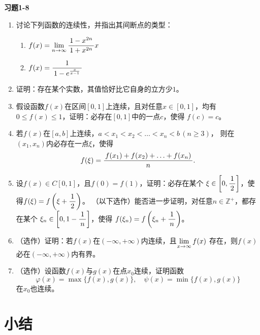 \begin{ext}
	{\centering\bf 习题1-8}
	
	\begin{enumerate}  
	  \item 讨论下列函数的连续性，并指出其间断点的类型：
	  \begin{enumerate}[(1)]
	  	\item $f(x)=\lim\limits_{n\to\infty}\displaystyle\frac{\,{1-x^{2n}}\,}{\,{1+x^{2n}}\,}x$
	  	\item $f(x)=\displaystyle\frac{\,{1}\,}{\,{1-e^{\frac{x}{x-1}}}\,}$
	  \end{enumerate}
	  \item 证明：存在某个实数，其值恰好比它自身的立方少$1$。
	  \item 假设函数$f(x)$在区间$[0,1]$上连续，且对任意$x\in[0,1]$，均有
		$0\leq f(x)\leq 1$，证明：必存在$[0,1]$中的一点$c$，使得
		$f(c)=c$。
	  \item 若$f(x)$在$[a,b]$上连续，$a<x_1<x_2<\ldots<x_n<b\,(n\geq3)$，
		则在$(x_1,x_n)$内必存在一点$\xi$，使得
		$$f(\xi)=\displaystyle\frac{\,{f(x_1)+f(x_2)+\ldots+f(x_n)}\,}{\,{n}\,}.$$ 
	  \item 设$f(x)\in C[0,1]$，且$f(0)=f(1)$，证明：必存在某个
	  $\xi\in\left[0,\displaystyle\frac{\,{1}\,}{\,{2}\,}\right]$，使得$f(\xi)=f\left(\xi+\displaystyle\frac{\,{1}\,}{\,{2}\,}\right)$。
	  （以下选作）能否进一步证明，对任意$n\in\mathbb{Z}^+$，都存在某个
	  $\xi_n\in\left[0,1-\displaystyle\frac{\,{1}\,}{\,{n}\,}\right]$，使得
	  $f(\xi_n)=f\left(\xi_n+\displaystyle\frac{\,{1}\,}{\,{n}\,}\right)$。
	  \item （选作）证明：若$f(x)$在$(-\infty,+\infty)$内连续，且$\lim\limits_{x\to{\infty}}f(x)$
		存在，则$f(x)$必在$(-\infty,+\infty)$内有界。
	  \item （选作）设函数$f(x)$与$g(x)$在点$x_0$连续，证明函数
		$$\varphi(x)=\max\{f(x),g(x)\},\quad
		\psi(x)=\min\{f(x),g(x)\}$$
		在$x_0$也连续。
	\end{enumerate}
\end{ext}

\newpage
\section{小结}

